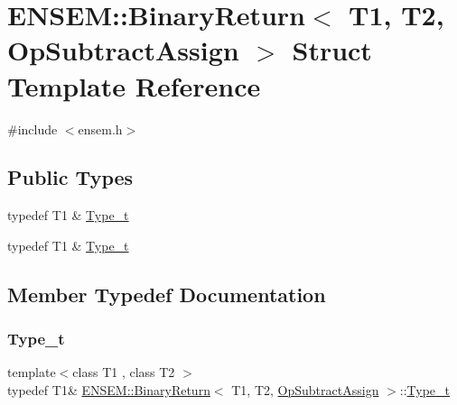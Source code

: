\hypertarget{structENSEM_1_1BinaryReturn_3_01T1_00_01T2_00_01OpSubtractAssign_01_4}{}\section{E\+N\+S\+EM\+:\+:Binary\+Return$<$ T1, T2, Op\+Subtract\+Assign $>$ Struct Template Reference}
\label{structENSEM_1_1BinaryReturn_3_01T1_00_01T2_00_01OpSubtractAssign_01_4}


{\ttfamily \#include $<$ensem.\+h$>$}

\subsection*{Public Types}
\begin{DoxyCompactItemize}
\item 
typedef T1 \& \mbox{\hyperlink{structENSEM_1_1BinaryReturn_3_01T1_00_01T2_00_01OpSubtractAssign_01_4_a21f38c2ce7ac4f73a438d38f65705fe7}{Type\+\_\+t}}
\item 
typedef T1 \& \mbox{\hyperlink{structENSEM_1_1BinaryReturn_3_01T1_00_01T2_00_01OpSubtractAssign_01_4_a21f38c2ce7ac4f73a438d38f65705fe7}{Type\+\_\+t}}
\end{DoxyCompactItemize}


\subsection{Member Typedef Documentation}
\mbox{\label{structENSEM_1_1BinaryReturn_3_01T1_00_01T2_00_01OpSubtractAssign_01_4_a21f38c2ce7ac4f73a438d38f65705fe7}} 
\subsubsection{\texorpdfstring{Type\_t}{Type\_t}\hspace{0.1cm}{\footnotesize\ttfamily [1/2]}}
{\footnotesize\ttfamily template$<$class T1 , class T2 $>$ \\
typedef T1\& \mbox{\hyperlink{structENSEM_1_1BinaryReturn}{E\+N\+S\+E\+M\+::\+Binary\+Return}}$<$ T1, T2, \mbox{\hyperlink{structENSEM_1_1OpSubtractAssign}{Op\+Subtract\+Assign}} $>$\+::\mbox{\hyperlink{structENSEM_1_1BinaryReturn_3_01T1_00_01T2_00_01OpSubtractAssign_01_4_a21f38c2ce7ac4f73a438d38f65705fe7}{Type\+\_\+t}}}

